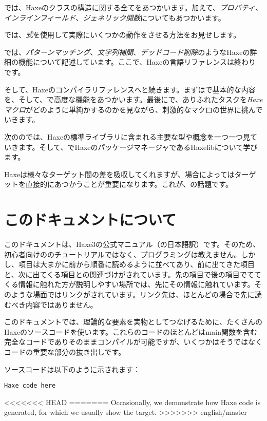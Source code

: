 では、Haxeのクラスの構造に関する全てをあつかいます。加えて、\emph{プロパティ}、\emph{インラインフィールド}、\emph{ジェネリック関数}についてもあつかいます。

では、\emph{式}を使用して実際にいくつかの動作をさせる方法をお見せします。

では、\emph{パターンマッチング}、\emph{文字列補間}、\emph{デッドコード削除}のようなHaxeの詳細の機能について記述しています。ここで、Haxeの言語リファレンスは終わりです。

そして、Haxeのコンパイラリファレンスへと続きます。まずはで基本的な内容を、そして、で高度な機能をあつかいます。最後にで、ありふれたタスクを\emph{Haxeマクロ}がどのように単純かするのかを見ながら、刺激的なマクロの世界に挑んでいきます。

次ののでは、Haxeの標準ライブラリに含まれる主要な型や概念を一つ一つ見ていきます。そして、でHaxeのパッケージマネージャであるHaxelibについて学びます。

Haxeは様々なターゲット間の差を吸収してくれますが、場合によってはターゲットを直接的にあつかうことが重要になります。これが、の話題です。

\section{このドキュメントについて}
\label{introduction-about-this-document}

このドキュメントは、Haxe3の公式マニュアル（の日本語訳）です。そのため、初心者向けののチュートリアルではなく、プログラミングは教えません。しかし、項目は大まかに前から順番に読めるように並べてあり、前に出てきた項目と、次に出てくる項目との関連づけがされています。先の項目で後の項目でててくる情報に触れた方が説明しやすい場所では、先にその情報に触れています。そのような場面ではリンクがされています。リンク先は、ほとんどの場合で先に読むべき内容ではありません。

このドキュメントでは、理論的な要素を実物としてつなげるために、たくさんのHaxeのソースコードを使います。これらのコードのほとんどはmain関数を含む完全なコードでありそのままコンパイルが可能ですが、いくつかはそうではなくコードの重要な部分の抜き出しです。

ソースコードは以下のように示されます：

\begin{lstlisting}
Haxe code here
\end{lstlisting}
<<<<<<< HEAD
=======
Occasionally, we demonstrate how Haxe code is generated, for which we usually show the  target.
>>>>>>> english/master

